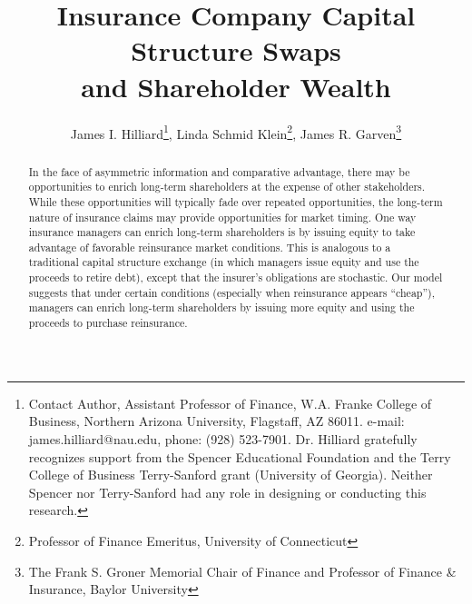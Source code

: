 \documentclass[11pt]{article}
\title{\textbf{Insurance Company Capital Structure Swaps \vspace{-2ex}\\and Shareholder Wealth}}
\author{James I. Hilliard\footnote{Contact Author, Assistant Professor of Finance, W.A. Franke College of Business, Northern Arizona University, Flagstaff, AZ 86011.  e-mail: james.hilliard@nau.edu, phone: (928) 523-7901. Dr. Hilliard gratefully recognizes support from the Spencer Educational Foundation and the Terry College of Business Terry-Sanford grant (University of Georgia).  Neither Spencer nor Terry-Sanford had any role in designing or conducting this research.}, Linda Schmid Klein\footnote{Professor of Finance Emeritus, University of Connecticut}, James R. Garven\footnote{The Frank S. Groner Memorial Chair of Finance and Professor of Finance \& Insurance, Baylor University}}
\begin{document}
\maketitle%

\begin{abstract}
In the face of asymmetric information and comparative advantage, there may be opportunities to enrich long-term shareholders at the expense of other stakeholders. While these opportunities will typically fade over repeated opportunities, the long-term nature of insurance claims may provide opportunities for market timing.  One way insurance managers can enrich long-term shareholders is by issuing equity to take advantage of favorable reinsurance market conditions. This is analogous to a traditional capital structure exchange (in which managers issue equity and use the proceeds to retire debt), except that the insurer's obligations are stochastic. Our model suggests that under certain conditions (especially when reinsurance appears ``cheap''), managers can enrich long-term shareholders by issuing more equity and using the proceeds to purchase reinsurance.

\end{abstract}








\end{document}
